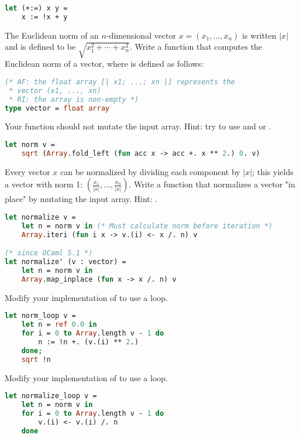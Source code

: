 \begin{lstlisting}[language=OCaml]
let (+:=) x y = 
	x := !x + y
\end{lstlisting}

\problem[norm]
The Euclidean norm of an $n$-dimensional vector $x = (x_1, \ldots, x_n)$ is written $|x|$ and is defined to be $\sqrt{x_1^2 + \cdots + x_n^2}$.
Write a function  that computes the Euclidean norm of a vector, where  is defined as follows:
\begin{lstlisting}[language=OCaml]
(* AF: the float array [| x1; ...; xn |] represents the
 * vector (x1, ..., xn)
 * RI: the array is non-empty *)
type vector = float array
\end{lstlisting}
Your function should not mutate the input array. Hint: try to use  and  or .

\begin{lstlisting}[language=OCaml]
let norm v =
	sqrt (Array.fold_left (fun acc x -> acc +. x ** 2.) 0. v)
\end{lstlisting}

\problem[normalize]
Every vector $x$ can be normalized by dividing each component by $|x|$; this yields a vector with norm 1: $(\frac{x_1}{|x|}, \ldots, \frac{x_n}{|x|})$.
Write a function  that normalizes a vector "in place" by mutating the input array. Hint: .

\begin{lstlisting}[language=OCaml]
let normalize v =
	let n = norm v in (* Must calculate norm before iteration *)
	Array.iteri (fun i x -> v.(i) <- x /. n) v

(* since OCaml 5.1 *)
let normalize' (v : vector) =
	let n = norm v in
	Array.map_inplace (fun x -> x /. n) v
\end{lstlisting}

Modify your implementation of  to use a loop.

\begin{lstlisting}[language=OCaml]
let norm_loop v =
	let n = ref 0.0 in
	for i = 0 to Array.length v - 1 do
		n := !n +. (v.(i) ** 2.)
	done;
	sqrt !n
\end{lstlisting}

Modify your implementation of  to use a loop.

\begin{lstlisting}[language=OCaml]
let normalize_loop v =
	let n = norm v in
	for i = 0 to Array.length v - 1 do
		v.(i) <- v.(i) /. n
	done
\end{lstlisting}

